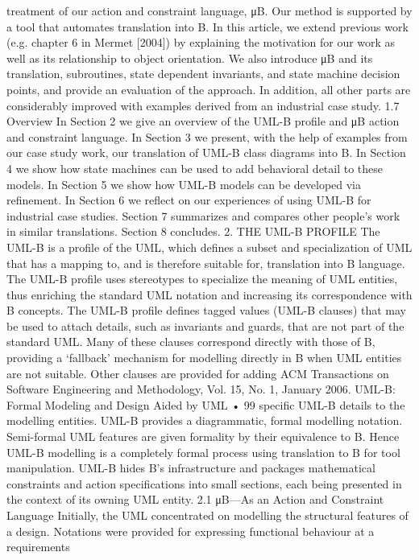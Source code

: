 treatment of our action and constraint language, μB. Our method is supported
by a tool that automates translation into B.
In this article, we extend previous work (e.g. chapter 6 in Mermet [2004])
by explaining the motivation for our work as well as its relationship to object
orientation. We also introduce μB and its translation, subroutines, state dependent invariants, and state machine decision points, and provide an evaluation
of the approach. In addition, all other parts are considerably improved with
examples derived from an industrial case study.
1.7 Overview
In Section 2 we give an overview of the UML-B profile and μB action and constraint language. In Section 3 we present, with the help of examples from our
case study work, our translation of UML-B class diagrams into B. In Section 4
we show how state machines can be used to add behavioral detail to these models. In Section 5 we show how UML-B models can be developed via refinement.
In Section 6 we reflect on our experiences of using UML-B for industrial case
studies. Section 7 summarizes and compares other people’s work in similar
translations. Section 8 concludes.
2. THE UML-B PROFILE
The UML-B is a profile of the UML, which defines a subset and specialization of
UML that has a mapping to, and is therefore suitable for, translation into B language. The UML-B profile uses stereotypes to specialize the meaning of UML
entities, thus enriching the standard UML notation and increasing its correspondence with B concepts. The UML-B profile defines tagged values (UML-B
clauses) that may be used to attach details, such as invariants and guards, that
are not part of the standard UML. Many of these clauses correspond directly
with those of B, providing a ‘fallback’ mechanism for modelling directly in B
when UML entities are not suitable. Other clauses are provided for adding
ACM Transactions on Software Engineering and Methodology, Vol. 15, No. 1, January 2006.
UML-B: Formal Modeling and Design Aided by UML • 99
specific UML-B details to the modelling entities. UML-B provides a diagrammatic, formal modelling notation. Semi-formal UML features are given formality by their equivalence to B. Hence UML-B modelling is a completely formal
process using translation to B for tool manipulation. UML-B hides B’s infrastructure and packages mathematical constraints and action specifications into
small sections, each being presented in the context of its owning UML entity.
2.1 μB—As an Action and Constraint Language
Initially, the UML concentrated on modelling the structural features of a design.
Notations were provided for expressing functional behaviour at a requirements
